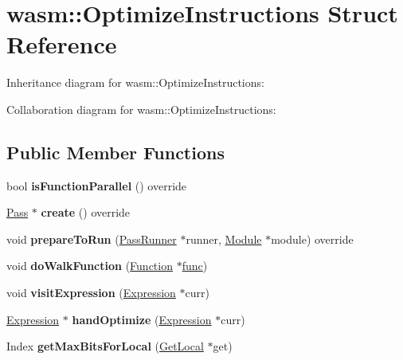 \hypertarget{structwasm_1_1_optimize_instructions}{}\section{wasm\+:\+:Optimize\+Instructions Struct Reference}
\label{structwasm_1_1_optimize_instructions}


Inheritance diagram for wasm\+:\+:Optimize\+Instructions\+:


Collaboration diagram for wasm\+:\+:Optimize\+Instructions\+:
\subsection*{Public Member Functions}
\begin{DoxyCompactItemize}
\item 
\mbox{\label{structwasm_1_1_optimize_instructions_a85b0a6579f94d3cfef071558689ef099}} 
bool {\bfseries is\+Function\+Parallel} () override
\item 
\mbox{\label{structwasm_1_1_optimize_instructions_a7cf66ffb1bf8f3e00da93e2e652740f3}} 
\mbox{\hyperlink{classwasm_1_1_pass}{Pass}} $\ast$ {\bfseries create} () override
\item 
\mbox{\label{structwasm_1_1_optimize_instructions_a6ed40367820daea57fc0df7c4faff51c}} 
void {\bfseries prepare\+To\+Run} (\mbox{\hyperlink{structwasm_1_1_pass_runner}{Pass\+Runner}} $\ast$runner, \mbox{\hyperlink{classwasm_1_1_module}{Module}} $\ast$module) override
\item 
\mbox{\label{structwasm_1_1_optimize_instructions_ac13287360c065823f3ef71747f99824a}} 
void {\bfseries do\+Walk\+Function} (\mbox{\hyperlink{classwasm_1_1_function}{Function}} $\ast$\mbox{\hyperlink{structfunc}{func}})
\item 
\mbox{\label{structwasm_1_1_optimize_instructions_a6d6091e0985ccb4af6965f69eb55be30}} 
void {\bfseries visit\+Expression} (\mbox{\hyperlink{classwasm_1_1_expression}{Expression}} $\ast$curr)
\item 
\mbox{\label{structwasm_1_1_optimize_instructions_a181b5427fe68247107422e8caa01f96d}} 
\mbox{\hyperlink{classwasm_1_1_expression}{Expression}} $\ast$ {\bfseries hand\+Optimize} (\mbox{\hyperlink{classwasm_1_1_expression}{Expression}} $\ast$curr)
\item 
\mbox{\label{structwasm_1_1_optimize_instructions_af86240882735457f508ab34419f1de1d}} 
Index {\bfseries get\+Max\+Bits\+For\+Local} (\mbox{\hyperlink{classwasm_1_1_get_local}{Get\+Local}} $\ast$get)
\end{DoxyCompactItemize}
